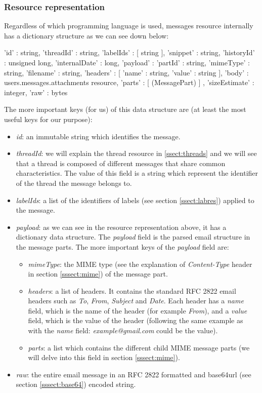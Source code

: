 \subsubsection{Resource representation}\label{sssect:msgresrep}

Regardless of which programming language is used, messages resource \citep[/v1/reference/users/messages]{gmailAPI} internally has a dictionary structure as we can see down below:

\begin{python}
{
'id' : string,
'threadId' : string,
'labelIds' : [ string ],
'snippet' : string,
'historyId' : unsigned long,
'internalDate' : long,
'payload' : {
	'partId' : string,
	'mimeType' : string,
	'filename' : string,
	'headers' : [
		{
		'name' : string,
		'value' : string
		}
	],
	'body' : users.messages.attachments resource,
	'parts' : [ (MessagePart) ]
	},
'sizeEstimate' : integer,
'raw' : bytes
}
\end{python}

The more important keys (for us) of this data structure are (at least the most useful keys for our purpose):
\begin{itemize}
	\item\textit{id}: an immutable string which identifies the message.
	\item\textit{threadId}: we will explain the thread resource in \ref{ssect:threads} and we will see that a thread is composed of different messages that share common characteristics. The value of this field is a string which represent the identifier of the thread the message belongs to.
	\item\textit{labelIds}: a list of the identifiers of labels (see section \ref{ssect:labres}) applied to the message.
	\item\textit{payload}: as we can see in the resource representation above, it has a dictionary data structure. The \textit{payload} field is the parsed email structure in the message parts. The more important keys of the \textit{payload} field are:
	\begin{itemize}
		\item\textit{mimeType}: the MIME type (see the explanation of \textit{Content-Type} header in section \ref{sssect:mime}) of the message part.
		\item\textit{headers}: a list of headers. It contains the standard RFC 2822 \citep{rfc2822} email headers such as \textit{To}, \textit{From}, \textit{Subject} and \textit{Date}. Each header has a \textit{name} field, which is the name of the header (for example \textit{From}), and a \textit{value} field, which is the value of the header (following the same example as with the \textit{name} field: \textit{example@gmail.com} could be the value).
		\item\textit{parts}: a list which contains the different child MIME message parts (we will delve into this field in section \ref{sssect:mime}).
	\end{itemize}
	\item\textit{raw}: the entire email message in an RFC 2822 \citep{rfc2822} formatted and base64url (see section \ref{sssect:base64}) encoded string.
\end{itemize}

